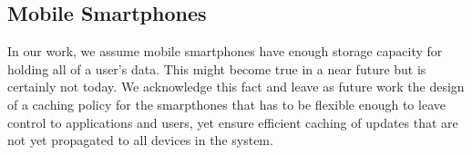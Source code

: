 \subsection {Mobile Smartphones}

In our work, we assume mobile smartphones have enough storage capacity
for holding all of a user's data. This might become true in a near
future but is certainly not today. We acknowledge this fact and leave
as future work the design of a caching policy for the smarpthones that
has to be flexible enough to leave control to applications and users,
yet ensure efficient caching of updates that are not yet propagated to
all devices in the system.


